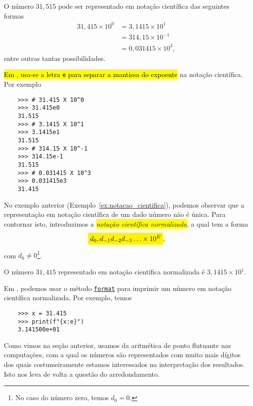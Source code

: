\begin{ex}\label{ex:notacao_cientifica}
  O número $31,515$ pode ser representado em notação científica das seguintes formas
  \begin{align}
    31,415\times 10^0 &= 3,1415\times 10^{1} \\
                      &= 314,15\times 10^{-1} \\
                      &= 0,031415\times 10^{3},
  \end{align}
  entre outras tantas possibilidades.

  \hl{Em {\python}, usa-se a letra {\lstinline+e+} para separar a mantissa do expoente} na notação científica. Por exemplo
  \begin{lstlisting}
    >>> # 31.415 X 10^0
    >>> 31.415e0
    31.515
    >>> # 3.1415 X 10^1
    >>> 3.1415e1
    31.515
    >>> # 314.15 X 10^-1
    >>> 314.15e-1
    31.515
    >>> # 0.031415 X 10^3
    >>> 0.031415e3
    31.415
  \end{lstlisting}
\end{ex}

No exemplo anterior (Exemplo~\ref{ex:notacao_cientifica}), podemos observar que a representação em notação científica de um dado número não é única. Para contornar isto, introduzimos a \colorbox{yellow}{\emph{notação científica normalizada}}, a qual tem a forma
\begin{equation}
  \hleq{d_0,d_{-1}d_{-2}d_{-3}\ldots\times 10^{E}},
\end{equation}
com $d_0 \neq 0$\footnote{No caso do número zero, temos $d_0=0$.}.

\begin{ex}
  O número $31,415$ representado em notação científica normalizada é $3,1415\times 10^{1}$.

  Em {\python}, podemos usar o método \href{https://docs.python.org/3.8/library/string.html#formatspec}{\lstinline+format+} para imprimir um número em notação científica normalizada. Por exemplo, temos
  \begin{lstlisting}
    >>> x = 31.415
    >>> print(f"{x:e}")
    3.141500e+01
  \end{lstlisting}
\end{ex}

Como vimos na seção anterior, usamos da aritmética de ponto flutuante nas computações, com a qual os números são representados com muito mais dígitos dos quais costumeiramente estamos interessados na interpretação dos resultados. Isto nos leva de volta a questão do arredondamento.

